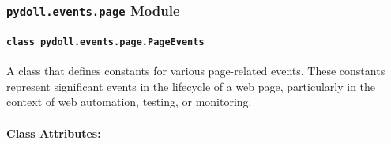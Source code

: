 \documentclass{article}
\begin{document}
\subsubsection*{\texttt{pydoll.events.page} Module}

\paragraph*{\texttt{class pydoll.events.page.PageEvents}}
\noindent A class that defines constants for various page-related events. These constants represent significant events in the lifecycle of a web page, particularly in the context of web automation, testing, or monitoring.

\paragraph{Class Attributes:}
\end{document}
